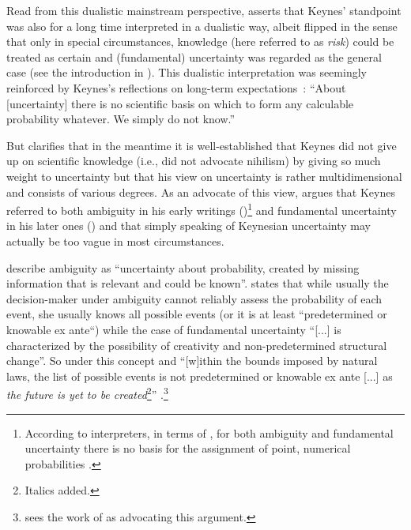 \documentclass[a4paper,11pt,listof=nochaptergap,oneside,pointednumbers,bibtotoc,bigheadings,liststotoc]{scrbook}
\theoremstyle{mysatz}
\theoremstyle{mydefinition}
\theoremstyle{mytheorem}
\theoremstyle{mybemerkung}
\begin{document}
Read from this dualistic mainstream perspective, \citet{dow:16} asserts that Keynes' standpoint was also for a long time interpreted in a dualistic way, albeit flipped in the sense that only in special circumstances, knowledge (here referred to as \textit{risk}) could be treated as certain and (fundamental) uncertainty was regarded as the general case (see the introduction in \citealp{keynes:21}). This dualistic interpretation was seemingly reinforced by Keynes's reflections on long-term expectations~\citep[p. 214/214]{keynes:37}: 
``About [uncertainty] there is no scientific basis on which to form any calculable probability whatever. We simply do not know.''

But \citet{dow:16} clarifies that in the meantime it is well-established that Keynes did not give up on scientific knowledge (i.e., did not advocate nihilism) by giving so much weight to uncertainty but that his view on uncertainty is rather multidimensional and consists of various degrees. As an advocate of this view, \citet{dequesh:00} argues that Keynes referred to both ambiguity in his early writings (\citealp{keynes:21})\footnote{According to interpreters, in terms of \citet{keynes:21}, for both ambiguity and fundamental uncertainty there is no basis for the assignment of point, numerical probabilities \citep{dequesh:00}.} and fundamental uncertainty in his later ones (\citealp{keynes:37}) and that simply speaking of Keynesian uncertainty may actually be too vague in most circumstances.

\citet[p. 330]{camererandweber:92} describe ambiguity as ``uncertainty about probability, created by missing information that is relevant and could be known''. \citet[p. 623]{dequech:14} states that while usually the decision-maker under ambiguity cannot reliably assess the probability of each event, she usually knows all possible events (or it is at least ``predetermined or knowable ex ante``) while the case of fundamental uncertainty ``[...] is characterized by the possibility of creativity and non-predetermined structural change''. So under this concept and ``[w]ithin the bounds imposed by natural laws, the list of possible events is not predetermined or knowable ex ante [...] as \textit{the future is yet to be created}\footnote{Italics added.}'' \citep[p. 623]{dequech:14}.\footnote{\citet{dequesh:00} sees the work of \citet{shackle:72} as advocating this argument.}
\end{document}
